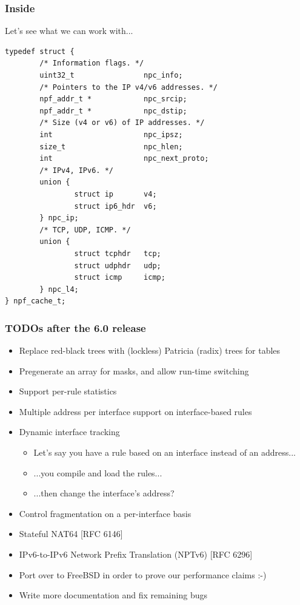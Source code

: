\documentclass[magyar]{beamer}
\begin{document}
\begin{frame}[fragile]
\frametitle{Inside}
Let's see what we can work with...
{\tiny
\begin{verbatim}
typedef struct {
        /* Information flags. */
        uint32_t                npc_info;
        /* Pointers to the IP v4/v6 addresses. */
        npf_addr_t *            npc_srcip;
        npf_addr_t *            npc_dstip;
        /* Size (v4 or v6) of IP addresses. */
        int                     npc_ipsz;
        size_t                  npc_hlen;
        int                     npc_next_proto;
        /* IPv4, IPv6. */
        union {
                struct ip       v4;
                struct ip6_hdr  v6;
        } npc_ip;
        /* TCP, UDP, ICMP. */
        union {
                struct tcphdr   tcp;
                struct udphdr   udp;
                struct icmp     icmp;
        } npc_l4;
} npf_cache_t;
\end{verbatim}
}
\end{frame}

\begin{frame}
\frametitle{TODOs after the 6.0 release}
\begin{itemize}
	\item Replace red-black trees with (lockless) Patricia (radix) trees for tables
\pause
	\item Pregenerate an array for masks, and allow run-time switching
\pause
	\item Support per-rule statistics
\pause
	\item Multiple address per interface support on interface-based rules
	\item Dynamic interface tracking
		\begin{itemize}
			\item Let's say you have a rule based on an interface instead of an address...
			\item ...you compile and load the rules...
			\item ...then change the interface's address?
		\end{itemize}
	\item Control fragmentation on a per-interface basis
\pause
	\item Stateful NAT64 [RFC 6146]
	\item IPv6-to-IPv6 Network Prefix Translation (NPTv6) [RFC 6296]
\pause
	\item Port over to FreeBSD in order to prove our performance claims :-)
\pause
	\item Write more documentation and fix remaining bugs
\end{itemize}
\end{frame}
\end{document}

